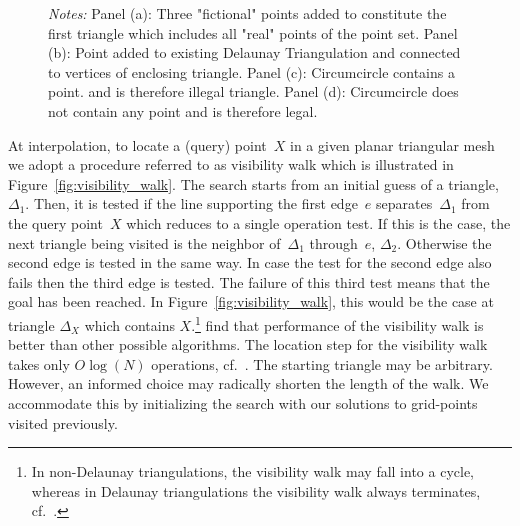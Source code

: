 \documentclass[a4paper,12pt]{article}
\begin{document}
\begin{figure}[htb]
\begin{tabular}{cC{1cm}c}
	\end{tabular}
	\caption*{\footnotesize{\emph{Notes:} Panel (a): Three "fictional" points added to constitute the first triangle which includes all "real" points of the point set. Panel (b): Point added to existing Delaunay Triangulation and connected to vertices of enclosing triangle. Panel (c): Circumcircle contains a point. and is therefore illegal triangle. Panel (d): Circumcircle does not contain any point and is therefore legal.}}
\end{figure}

At interpolation, to locate a (query) point~$X$ in a given planar triangular mesh we adopt a procedure referred to as visibility walk which is illustrated in Figure~\ref{fig:visibility_walk}. The search starts from an initial guess of a triangle,~$\Delta_{1}$. Then, it is tested if the line supporting the first edge~$e$ separates~$\Delta_{1}$ from the query point~$X$ which reduces to a single operation test. If this is the case, the next triangle being visited is the neighbor of~$\Delta_{1}$ through~$e$, $\Delta_{2}$. Otherwise the second edge is tested in the same way. In case the test for the second edge also fails then the third edge is tested. The failure of this third test means that the goal has been reached. In Figure~\ref{fig:visibility_walk}, this would be the case at triangle $\Delta_{X}$ which contains $X$.\footnote{In non-Delaunay triangulations, the visibility walk may fall into a cycle, whereas in Delaunay triangulations the visibility walk always terminates, cf.~.}
 find that performance of the visibility walk is better than other possible algorithms. The location step for the visibility walk takes only $O\log\left(N\right)$ operations, cf.~. The starting triangle may be arbitrary. However, an informed choice may radically shorten the length of the walk. We accommodate this by initializing the search with our solutions to grid-points visited previously.
\end{document}
